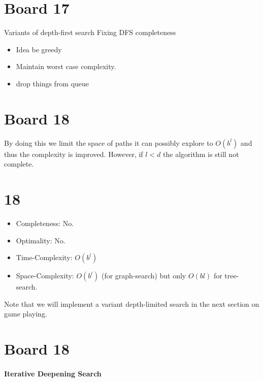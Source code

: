 \documentclass[10pt]{article}
\begin{document}
\section{Board 17}

Variants of depth-first search
Fixing DFS completeness

\begin{itemize}
\item Idea be greedy
\item Maintain worst case complexity.
\item drop things from queue
\end{itemize}


\section{Board 18}

By
doing this we limit the space of paths it can possibly explore to
$O(b^l)$ and thus the complexity is improved. However, if $l < d$ the
algorithm is still not complete.

\section{18}
\begin{itemize}
\item Completeness: No.  
\item Optimality: No.
\item Time-Complexity: $O(b^l)$ 
\item Space-Complexity: $O(b^l)$ (for graph-search) but only $O(bl)$ for tree-search.
\end{itemize}


\noindent Note that we will implement a variant depth-limited search in the next section on game playing.

\section{Board 18}
\paragraph{Iterative Deepening Search}
\end{document}

